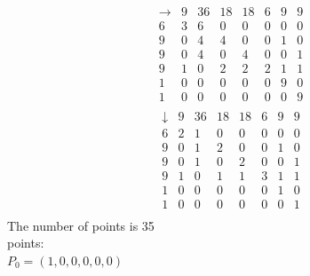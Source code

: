 $$
\begin{array}{r|*{7}{r}}
\rightarrow  &      9 &     36 &     18 &     18 &      6 &      9 &      9\\
\hline
     6 &            3 &            6 &            0 &            0 &            0 &            0 &            0\\
     9 &            0 &            4 &            4 &            0 &            0 &            1 &            0\\
     9 &            0 &            4 &            0 &            4 &            0 &            0 &            1\\
     9 &            1 &            0 &            2 &            2 &            2 &            1 &            1\\
     1 &            0 &            0 &            0 &            0 &            0 &            9 &            0\\
     1 &            0 &            0 &            0 &            0 &            0 &            0 &            9\\
\end{array}
$$
$$
\begin{array}{r|*{7}{r}}
\downarrow  &      9 &     36 &     18 &     18 &      6 &      9 &      9\\
\hline
     6 &            2 &            1 &            0 &            0 &            0 &            0 &            0\\
     9 &            0 &            1 &            2 &            0 &            0 &            1 &            0\\
     9 &            0 &            1 &            0 &            2 &            0 &            0 &            1\\
     9 &            1 &            0 &            1 &            1 &            3 &            1 &            1\\
     1 &            0 &            0 &            0 &            0 &            0 &            1 &            0\\
     1 &            0 &            0 &            0 &            0 &            0 &            0 &            1\\
\end{array}
$$
The number of points is 35\\
points:\\
$P_{0} = ( 1, 0, 0, 0, 0, 0 )$\\
